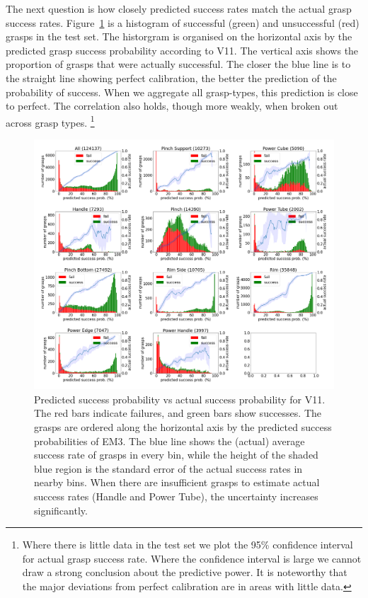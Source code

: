 The next question is how closely predicted success rates match the actual grasp success rates. Figure~\ref{fig:calibrate} is a histogram of successful (green) and unsuccessful (red) grasps in the test set. The historgram is organised on the horizontal axis by the predicted grasp success probability according to V11. The vertical axis shows the proportion of grasps that were actually successful. The closer the blue line is to the straight line showing perfect calibration, the better the prediction of the probability of success. When we aggregate all grasp-types, this prediction is close to perfect. The correlation also holds, though more weakly, when broken out across grasp types. \footnote{Where there is little data in the test set we plot the 95\% confidence interval for actual grasp success rate. Where the confidence interval is large we cannot draw a strong conclusion about the predictive power. It is noteworthy that the major deviations from perfect calibration are in areas with little data.}

\begin{figure}[h]
\centering
\includegraphics[width=1.02\columnwidth]{images/post-analysis/V11_pred_success_vs_success.png}
\caption{Predicted success probability vs actual success probability for V11. The red bars indicate failures, and green bars show successes. The grasps are ordered along the horizontal axis by the predicted success probabilities of EM3. The blue line shows the (actual) average success rate of grasps in every bin, while the height of the shaded blue region is the standard error of the actual success rates in nearby bins. When there are insufficient grasps to estimate actual success rates (Handle and Power Tube), the uncertainty increases significantly.}
\label{fig:calibrate}
\end{figure}

